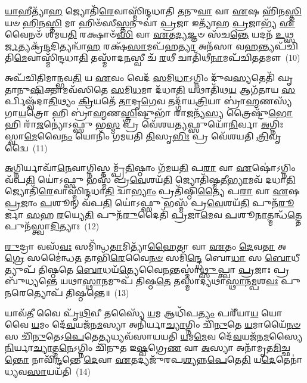 \-\ul{𑌯𑌾}\-𑌹𑍀𑌤𑍍𑌯𑌾᳴\-\ul{𑌹} 𑌜𑍍𑌯𑍋𑌤𑌿᳴\-\ul{𑌰𑍇}\-𑌵𑌾𑌸𑍍𑌮𑌿᳴𑌨𑍍𑌦𑌧𑌾𑌤𑌿 \ul{𑌤}\-𑌨𑍁\-\ul{𑌵𑌾} 𑌵𑌾 \ul{𑌏}\-𑌷 𑌹𑌿᳴𑌨\-\ul{𑌸𑍍𑌤𑌿} 𑌯𑍞 \ul{𑌹𑌿}\-𑌨\-\ul{𑌸𑍍𑌤𑌿} 𑌮𑌾 𑌹𑌿𑍞᳴𑌸𑍀\-\ul{𑌸𑍍𑌤}\-𑌨𑍁𑌵𑌾॑ \ul{𑌪𑍍𑌰}\-𑌜𑌾 𑌇𑌤𑍍𑌯𑌾᳴𑌹 \ul{𑌪𑍍𑌰}\-𑌜𑌾𑌭𑍍𑌯᳴ \ul{𑌏}\-𑌵𑍈𑌨𑍞᳴ 𑌶𑌮𑌯\-\ul{𑌤𑌿} 𑌰𑌕𑍍𑌷𑌾𑍞᳴\-\ul{𑌸𑌿} 𑌵𑌾 \ul{𑌏}\-𑌤\-\ul{𑌦𑍍𑌯}\-𑌜𑍍𑌞𑍞 𑌸᳴𑌚\-\ul{𑌨𑍍𑌤𑍇} 𑌯𑌦𑌨᳴ \ul{𑌉}\-𑌥𑍍𑌸\-\ul{𑌰𑍍𑌜}\-𑌤𑍍𑌯𑌕𑍍𑌰᳴\-\ul{𑌨𑍍𑌦}\-𑌦𑌿𑌤𑍍𑌯𑌨𑍍𑌵𑌾᳴\-\ul{𑌹} 𑌰𑌕𑍍𑌷᳴\-\ul{𑌸𑌾}\-𑌮𑌪᳴𑌹\-\ul{𑌤𑍍𑌯𑌾} 𑌅𑌨᳴𑌸𑌾 𑌵\-\ul{𑌹}\-𑌨𑍍𑌤𑍍𑌯𑌪᳴𑌚𑌿𑌤𑌿\-\ul{𑌮𑍇}\-𑌵𑌾𑌸𑍍𑌮𑌿᳴𑌨𑍍𑌦𑌧𑌾\-\ul{𑌤𑌿} 𑌤𑌸𑍍𑌮𑌾᳴𑌦\-\ul{𑌨}\-𑌸𑍍𑌵𑍀 𑌚᳴ \ul{𑌰}\-𑌥𑍀 𑌚𑌾𑌤𑌿᳴𑌥𑍀\-\ul{𑌨𑌾}\-𑌮𑌪᳴𑌚𑌿𑌤𑌤𑌮𑍗~(10)

𑌅𑌪᳴𑌚𑌿𑌤𑌿𑌮𑌾𑌨𑍍𑌭𑌵\-\ul{𑌤𑌿} 𑌯 \ul{𑌏}\-𑌵𑌂 𑌵𑍇𑌦᳴ \ul{𑌸}\-𑌮𑌿\-\ul{𑌧𑌾}\-\-𑌽𑌗𑍍𑌨𑌿𑌂 𑌦𑍁᳴𑌵\-\ul{𑌸𑍍𑌯}\-𑌤𑍇𑌤𑌿᳴ 𑌘𑍃𑌤𑌾𑌨𑍁\-\ul{𑌷𑌿}\-𑌕𑍍𑌤𑌾𑌮𑌵᳴𑌸𑌿𑌤𑍇 \ul{𑌸}\-𑌮𑌿\-\ul{𑌧}\-𑌮𑌾 𑌦᳴𑌧𑌾\-\ul{𑌤𑌿} 𑌯𑌥𑌾𑌤𑌿᳴𑌥\-\ul{𑌯} 𑌆𑌗᳴𑌤𑌾𑌯 \ul{𑌸}\-𑌰𑍍𑌪𑌿𑌷𑍍𑌵᳴𑌦𑌾\-\ul{𑌤𑌿}\-𑌥𑍍𑌯𑌂 \ul{𑌕𑍍𑌰𑌿}\-𑌯𑌤𑍇᳴ \ul{𑌤𑌾}\-𑌦𑍃\-\ul{𑌗𑍇}\-𑌵 𑌤𑌦𑍍𑌗𑌾᳴𑌯\-\ul{𑌤𑍍𑌰𑌿}\-𑌯𑌾 𑌬𑍍𑌰𑌾॑\-\ul{𑌹𑍍𑌮}\-𑌣𑌸𑍍𑌯᳴ 𑌗𑌾\-\ul{𑌯}\-𑌤𑍍𑌰𑍋 𑌹𑌿 𑌬𑍍𑌰𑌾॑\-\ul{𑌹𑍍𑌮}\-𑌣\-\ul{𑌸𑍍𑌤𑍍𑌰𑌿}\-𑌷𑍍𑌟𑍁𑌭𑌾᳴ 𑌰𑌾\-\ul{𑌜}\-𑌨𑍍𑌯᳴\-\ul{𑌸𑍍𑌯} 𑌤𑍍𑌰𑍈𑌷𑍍𑌟𑍁᳴\-\ul{𑌭𑍋} 𑌹𑌿 𑌰𑌾᳴\-\ul{𑌜}\-𑌨𑍍𑌯𑍋॑\-𑌽𑌫𑍍𑌸𑍁 𑌭\-\ul{𑌸𑍍𑌮} 𑌪𑍍𑌰 𑌵𑍇᳴𑌶𑌯\-\ul{𑌤𑍍𑌯}\-𑌫𑍍𑌸𑍁𑌯𑍋᳴\-\ul{𑌨𑌿}\-𑌰𑍍𑌵𑌾 \ul{𑌅}\-𑌗𑍍𑌨𑌿𑌃 𑌸𑍍𑌵𑌾\-\ul{𑌮𑍇}\-𑌵𑍈\-\ul{𑌨𑌂} 𑌯𑍋𑌨𑌿𑌂᳴ 𑌗𑌮𑌯𑌤𑌿 \ul{𑌤𑌿}\-𑌸𑍃\-\ul{𑌭𑌿𑌃} 𑌪𑍍𑌰 𑌵𑍇᳴𑌶𑌯𑌤𑌿 \ul{𑌤𑍍𑌰𑌿}\-𑌵𑍃𑌦𑍍𑌵𑍈~(11)

\-\ul{𑌅}\-𑌗𑍍𑌨𑌿𑌰𑍍𑌯𑌾𑌵𑌾᳴\-\ul{𑌨𑍇}\-𑌵𑌾𑌗𑍍𑌨𑌿𑌸𑍍𑌤𑌮𑍍𑌪𑍍𑌰᳴\-\ul{𑌤𑌿}\-𑌷𑍍𑌠𑌾𑌂 𑌗᳴𑌮𑌯\-\ul{𑌤𑌿} 𑌪\-\ul{𑌰𑌾} 𑌵𑌾 \ul{𑌏}\-𑌷𑍋॑\-𑌽𑌗𑍍𑌨𑌿𑌂 𑌵᳴𑌪\-\ul{𑌤𑌿} 𑌯𑍋॑\-𑌽𑌫𑍍𑌸𑍁 𑌭𑌸𑍍𑌮᳴ 𑌪𑍍𑌰\-\ul{𑌵𑍇}\-𑌶𑌯᳴\-\ul{𑌤𑌿} 𑌜𑍍𑌯𑍋𑌤𑌿᳴𑌷𑍍𑌮𑌤𑍀\-\ul{𑌭𑍍𑌯𑌾}\-𑌮𑌵᳴ 𑌦𑌧𑌾\-\ul{𑌤𑌿} 𑌜𑍍𑌯𑍋𑌤𑌿᳴\-\ul{𑌰𑍇}\-𑌵𑌾𑌸𑍍𑌮𑌿᳴𑌨𑍍𑌦𑌧𑌾\-\ul{𑌤𑌿} 𑌦𑍍𑌵𑌾\-\ul{𑌭𑍍𑌯𑌾𑌂} 𑌪𑍍𑌰𑌤𑌿᳴𑌷𑍍𑌠𑌿\-\ul{𑌤𑍍𑌯𑍈} 𑌪\-\ul{𑌰𑌾} 𑌵𑌾 \ul{𑌏}\-𑌷 \ul{𑌪𑍍𑌰}\-𑌜𑌾𑌂 \ul{𑌪}\-𑌶𑍂𑌨𑍍 𑌵᳴𑌪\-\ul{𑌤𑌿} 𑌯𑍋॑\-𑌽𑌫𑍍𑌸𑍁 𑌭𑌸𑍍𑌮᳴ 𑌪𑍍𑌰\-\ul{𑌵𑍇}\-𑌶𑌯᳴\-\ul{𑌤𑌿} 𑌪𑍁𑌨᳴\-\ul{𑌰𑍂}\-𑌰𑍍𑌜𑌾 \ul{𑌸}\-𑌹 \ul{𑌰}\-𑌯𑍍𑌯𑍇\-\ul{𑌤𑌿} 𑌪𑍁𑌨᳴\-\ul{𑌰𑍁}\-𑌦𑍈𑌤𑌿᳴ \ul{𑌪𑍍𑌰}\-𑌜𑌾\-\ul{𑌮𑍇}\-𑌵 \ul{𑌪}\-𑌶𑍂\-\ul{𑌨𑌾}\-𑌤𑍍𑌮𑌨𑍍𑌧᳴\-\ul{𑌤𑍍𑌤𑍇} 𑌪𑍁𑌨᳴𑌸𑍍𑌤𑍍𑌵𑌾\-\ul{𑌦𑌿}\-𑌤𑍍𑌯𑌾𑌃~(12)

\-\ul{𑌰𑍁}\-𑌦𑍍𑌰𑌾 𑌵𑌸᳴\-\ul{𑌵𑌃} 𑌸𑌮𑌿᳴𑌨𑍍𑌧\-\ul{𑌤𑌾}\-𑌮𑌿𑌤𑍍𑌯𑌾᳴\-\ul{𑌹𑍈}\-𑌤𑌾 𑌵𑌾 \ul{𑌏}\-𑌤𑌂 \ul{𑌦𑍇}\-𑌵\-\ul{𑌤𑌾} 𑌅\-\ul{𑌗𑍍𑌰𑍇} 𑌸𑌮𑍈॑𑌨𑍍𑌧\-\ul{𑌤} 𑌤𑌾𑌭𑌿᳴\-\ul{𑌰𑍇}\-𑌵𑍈\-\ul{𑌨}\-\-\ul{𑍞} 𑌸𑌮𑌿᳴\-\ul{𑌨𑍍𑌦𑍍𑌧𑍇} 𑌬𑍋\-\ul{𑌧𑌾} 𑌸 \ul{𑌬𑍋}\-𑌧𑍀𑌤𑍍𑌯𑍁𑌪᳴ 𑌤𑌿𑌷𑍍𑌠𑌤𑍇 \ul{𑌬𑍋}\-𑌧𑌯᳴\-\ul{𑌤𑍍𑌯𑍇}\-𑌵𑍈\-\ul{𑌨}\-𑌨𑍍𑌤𑌸𑍍𑌮𑌾॑\-\ul{𑌥𑍍𑌸𑍁}\-𑌪𑍍𑌤𑍍𑌵𑌾 \ul{𑌪𑍍𑌰}\-𑌜𑌾𑌃 𑌪𑍍𑌰 𑌬𑍁᳴𑌧𑍍𑌯𑌨𑍍𑌤𑍇 𑌯𑌥𑌾\-\ul{𑌸𑍍𑌥𑌾}\-𑌨𑌮𑍁𑌪᳴ 𑌤𑌿𑌷𑍍𑌠\-\ul{𑌤𑍇} 𑌤𑌸𑍍𑌮𑌾॑𑌦𑍍𑌯𑌥𑌾\-\ul{𑌸𑍍𑌥𑌾}\-𑌨\-\ul{𑌮𑍍𑌪}\-𑌶\-\ul{𑌵𑌃} 𑌪𑍁\-\ul{𑌨}\-𑌰𑍇𑌤𑍍𑌯𑍋𑌪᳴ 𑌤𑌿𑌷𑍍𑌠𑌨𑍍𑌤𑍇॥~(13)

{}%

𑌯𑌾𑌵᳴\-\ul{𑌤𑍀} 𑌵𑍈 𑌪𑍃᳴\-\ul{𑌥𑌿}\-𑌵𑍀 𑌤𑌸𑍍𑌯𑍈᳴ \ul{𑌯}\-𑌮 𑌆𑌧𑌿᳴𑌪\-\ul{𑌤𑍍𑌯𑌂} 𑌪𑌰𑍀᳴𑌯𑌾\-\ul{𑌯} 𑌯𑍋 𑌵𑍈 \ul{𑌯}\-𑌮𑌂 𑌦𑍇᳴\-\ul{𑌵}\-𑌯𑌜᳴𑌨\-\ul{𑌮}\-𑌸𑍍𑌯𑌾 𑌅𑌨𑌿᳴𑌰𑍍𑌯𑌾\-\ul{𑌚𑍍𑌯𑌾}\-𑌗𑍍𑌨𑌿𑌂 𑌚𑌿᳴\-\ul{𑌨𑍁}\-𑌤𑍇 \ul{𑌯}\-𑌮𑌾𑌯𑍈᳴\-\ul{𑌨}\-\-\ul{𑍞} 𑌸 𑌚𑌿᳴\-\ul{𑌨𑍁}\-𑌤𑍇\-𑌽\-\ul{𑌪𑍇}\-𑌤𑍇\-\ul{𑌤𑍍𑌯}\-𑌧𑍍𑌯𑌵᳴𑌸𑌾𑌯𑌯𑌤𑌿 \ul{𑌯}\-𑌮\-\ul{𑌮𑍇}\-𑌵 𑌦𑍇᳴\-\ul{𑌵}\-𑌯𑌜᳴𑌨\-\ul{𑌮}\-𑌸𑍍𑌯𑍈 \ul{𑌨𑌿}\-𑌰𑍍𑌯𑌾\-\ul{𑌚𑍍𑌯𑌾}\-𑌤𑍍𑌮\-\ul{𑌨𑍇}\-\-𑌽𑌗𑍍𑌨𑌿𑌂 𑌚𑌿᳴𑌨𑍁𑌤 𑌇\-\ul{𑌷𑍍𑌵}\-𑌗𑍍𑌰𑍇\-\ul{𑌣} 𑌵𑌾 \ul{𑌅}\-𑌸𑍍𑌯𑌾 𑌅𑌨𑌾᳴𑌮𑍃𑌤\-\ul{𑌮𑌿}\-𑌚𑍍𑌛\-\ul{𑌨𑍍𑌤𑍋} 𑌨𑌾𑌵𑌿᳴\-\ul{𑌨𑍍𑌦}\-𑌨𑍍𑌤𑍇 \ul{𑌦𑍇}\-𑌵𑌾 \ul{𑌏}\-𑌤𑌦𑍍𑌯𑌜𑍁᳴𑌰𑌪\-\ul{𑌶𑍍𑌯}\-𑌨𑍍𑌨\-\ul{𑌪𑍇}\-𑌤𑍇\-\ul{𑌤𑌿} 𑌯\-\ul{𑌦𑍇}\-𑌤𑍇𑌨𑌾॑𑌧𑍍𑌯𑌵\-\ul{𑌸𑌾}\-𑌯𑌯᳴𑌤𑌿~(14)

